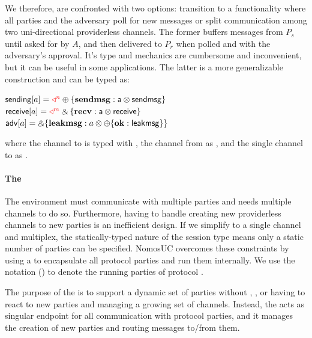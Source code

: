 We therefore, are confronted with two options: transition to a functionality where all parties and the adversary poll for new messages or split communication among two uni-directional providerless channels.
The former buffers messages from $P_s$ until asked for by $A$, and then delivered to $P_r$ when polled and with the adversary's approval.
It's type and mechanics are cumbersome and inconvenient, but it can be useful in some applications.
The latter is a more generalizable construction and can be typed as: 
\begin{center}
\parbox{0cm}{
\begin{tabbing}
$\mathsf{sending}[a] = \textcolor{red}{\triangleleft^n} \oplus \{ \mathbf{sendmsg}: \mathsf{a} \otimes \mathsf{sendmsg} \}$ \\
$\mathsf{receive}[a] = \textcolor{red}{\triangleleft^m} \mathbin{\binampersand} \{ \mathbf{recv}: \mathsf{a} \otimes \mathsf{receive} \}$ \\
$\mathsf{adv}[a] = \mathbin{\binampersand} \{ \mathbf{leakmsg}: a \otimes \oplus \{  \mathbf{ok}: \mathsf{leakmsg} \} \}$
\end{tabbing}}
\end{center}
where the channel to \Fauth is typed with , the channel from \Fauth as , and the single channel to \A as .

\paragraph*{\textbf{The \partywrapper}}
The environment must communicate with multiple parties and needs multiple channels to do so. 
Furthermore, \Z having to handle creating new providerless channels to new parties is an inefficient design.
If we simplify to a single channel and multiplex, the statically-typed nature of the session type means only a static number of parties can be specified. 
NomosUC overcomes these constraints by using a \partywrapper to encapsulate all protocol parties and run them internally.%
We use the notation (\PI) to denote the \partywrapper running parties of protocol \PI.

The purpose of the \partywrapper is to support a dynamic set of parties without \Z, \A, or \F having to react to new parties and managing a growing set of channels.
Instead, the \partywrapper acts as singular endpoint for all communication with protocol parties, and it manages the creation of new parties and routing messages to/from them.

